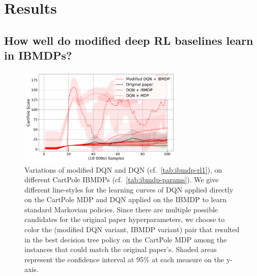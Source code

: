 \section{Results}

\subsection{How well do modified deep RL baselines learn in IBMDPs?}

\begin{figure}
    \centering
    \includegraphics[width=0.7\textwidth]{images/images_part1/dqn.pdf}
    \caption{Variations of modified DQN and DQN (cf.~\ref{tab:ibmdp-rl1}), on different CartPole IBMDPs (cf.~\ref{tab:ibmdp-params}). We give different line-styles for the learning curves of DQN applied directly on the CartPole MDP and DQN applied on the IBMDP to learn standard Markovian policies.
    Since there are multiple possible candidates for the original paper hyperparameters, we choose to color the (modified DQN variant, IBMDP variant) pair that resulted in the best decision tree policy on the CartPole MDP among the instances that could match the original paper's.
    Shaded areas represent the confidence interval at 95\% at each measure on the y-axis.}
\end{figure}\label{fig:res-dqn}

